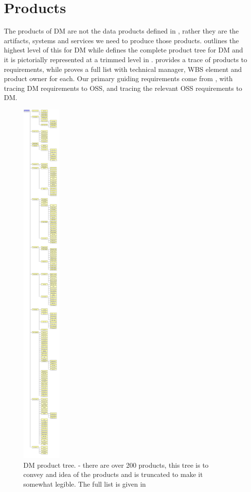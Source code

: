 \section{Products \label{sect:products}}

The products of DM are not the data products defined in , rather they are the artifacts, systems and services  we need to produce those products.  outlines the highest level of this for DM while    defines the complete product tree for DM and it is pictorially represented at a trimmed level in  .
 provides a trace of products to requirements, while  proves a full list with technical manager, WBS element and product owner for each.
Our primary guiding requirements come from , with  tracing DM requirements  to OSS, and  tracing the relevant OSS requirements to DM.

\begin{figure}[htbp]
	\begin{center}
		 \includegraphics[height=19cm]{ProductTree}
		 \caption{DM product tree. \label{fig:prods}- there are over 200 products, this tree is to convey and idea of the products and is truncated to make it somewhat legible.
		 The full list is given in 
	 }

	 \end{center}
 \end{figure}

